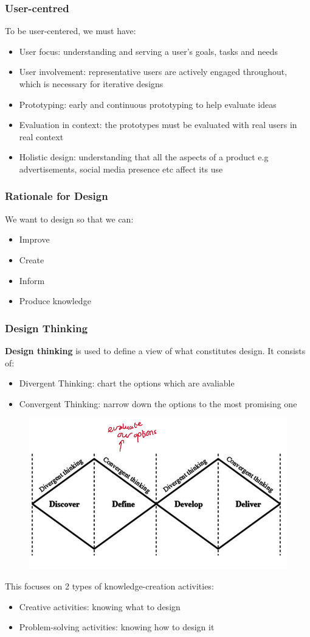 \documentclass{article}
\begin{document}
\subsubsection*{User-centred}
To be user-centered, we must have:
\begin{itemize}
    \item User focus: understanding and serving a user's goals, tasks and needs
    \item User involvement: representative users are actively engaged throughout, which is necessary for iterative designs
    \item Prototyping: early and continuous prototyping to help evaluate ideas
    \item Evaluation in context: the prototypes must be evaluated with real users in real context
    \item Holistic design: understanding that all the aspects of a product e.g advertisements, social media presence etc affect its use
\end{itemize}
\subsubsection*{Rationale for Design}
We want to design so that we can:
\begin{itemize}
    \item Improve
    \item Create
    \item Inform
    \item Produce knowledge
\end{itemize}
\subsubsection*{Design Thinking}
\textbf{Design thinking} is used to define a view of what constitutes design. It consists of:
\begin{itemize}
    \item Divergent Thinking: chart the options which are avaliable
    \item Convergent Thinking: narrow down the options to the most promising one
\end{itemize}
\begin{figure}[H]
    \centering
    \includegraphics[width=0.6\linewidth]{Pictures/Screenshot 2023-03-08 at 12.19.41.png}
\end{figure}
This focuses on 2 types of knowledge-creation activities:
\begin{itemize}
    \item Creative activities: knowing what to design
    \item Problem-solving activities: knowing how to design it
\end{itemize}
\end{document}
